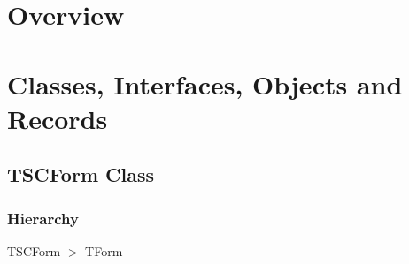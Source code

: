 \documentclass{report}
\newif\ifpdf
\begin{document}
\section{Overview}
\begin{description}
\item[\texttt{\begin{ttfamily}TSCForm\end{ttfamily} Class}]
\item[\texttt{\begin{ttfamily}TCTLEntry\end{ttfamily} Class}]
\end{description}
\section{Classes, Interfaces, Objects and Records}
\ifpdf
\subsection*{\large{\textbf{TSCForm Class}}\normalsize\hspace{1ex}\hrulefill}
\else
\subsection*{TSCForm Class}
\fi
\label{swcatalog.TSCForm}
\subsubsection*{\large{\textbf{Hierarchy}}\normalsize\hspace{1ex}\hfill}
TSCForm {$>$} TForm
\end{document}
